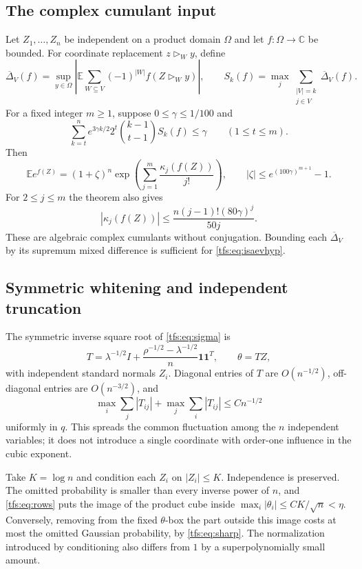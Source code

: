 \documentclass[11pt,a4paper]{article}
\numberwithin{equation}{section}
\theoremstyle{remark}
\newcommand{\E}{\mathbb E}
\newcommand{\1}{\mathbf 1}
\begin{document}
\subsection{The complex cumulant input}
Let $Z_1,\ldots,Z_n$ be independent on a product domain $\Omega$ and let
$f:\Omega\to\mathbb C$ be bounded. For coordinate replacement
$z\triangleright_W y$, define
\[
\overline\Delta_V(f)=\sup_{y\in\Omega}
 \left|\E\sum_{W\subseteq V}(-1)^{|W|}f(Z\triangleright_Wy)\right|,
\qquad S_k(f)=\max_j\sum_{\substack{|V|=k\\j\in V}}
                                            \overline\Delta_V(f).
\]
For a fixed integer $m\geq1$, suppose $0\leq\gamma\leq1/100$ and
\begin{equation}\label{tfs:eq:isaevhyp}
\sum_{k=t}^n e^{3\gamma k/2}2^t\binom{k-1}{t-1}S_k(f)\leq\gamma
                  \qquad(1\leq t\leq m).
\end{equation}
Then
\begin{equation}\label{tfs:eq:isaevconcl}
\E e^{f(Z)}=(1+\zeta)^n
       \exp\left(\sum_{j=1}^m\frac{\kappa_j(f(Z))}{j!}\right),
\qquad |\zeta|\leq e^{(100\gamma)^{m+1}}-1.
\end{equation}
For $2\leq j\leq m$ the theorem also gives
\[
|\kappa_j(f(Z))|\leq\frac{n(j-1)!(80\gamma)^j}{50j}.
\]
These are algebraic complex cumulants without conjugation.
Bounding each $\overline\Delta_V$ by its supremum mixed difference is
sufficient for \eqref{tfs:eq:isaevhyp}.

\subsection{Symmetric whitening and independent truncation}
The symmetric inverse square root of \eqref{tfs:eq:sigma} is
\begin{equation}\label{tfs:eq:T}
T=\lambda^{-1/2}I+
           \frac{\rho^{-1/2}-\lambda^{-1/2}}n\1\1^T,
\qquad\theta=TZ,
\end{equation}
with independent standard normals $Z_i$. Diagonal entries of $T$ are
$O(n^{-1/2})$, off-diagonal entries are $O(n^{-3/2})$, and
\begin{equation}\label{tfs:eq:rows}
\max_i\sum_j|T_{ij}|+\max_j\sum_i|T_{ij}|\leq Cn^{-1/2}
\end{equation}
uniformly in $q$. This spreads the common fluctuation among the $n$
independent variables; it does not introduce a single coordinate with
order-one influence in the cubic exponent.

Take $K=\log n$ and condition each $Z_i$ on $|Z_i|\leq K$. Independence is
preserved. The omitted probability is smaller than every inverse power
of $n$, and \eqref{tfs:eq:rows} puts the image of the product cube inside
$\max_i|\theta_i|\leq CK/\sqrt n<\eta$. Conversely, removing from the
fixed $\theta$-box the part outside this image costs at most the omitted
Gaussian probability, by \eqref{tfs:eq:sharp}. The normalization introduced
by conditioning also differs from $1$ by a superpolynomially small amount.
\end{document}

